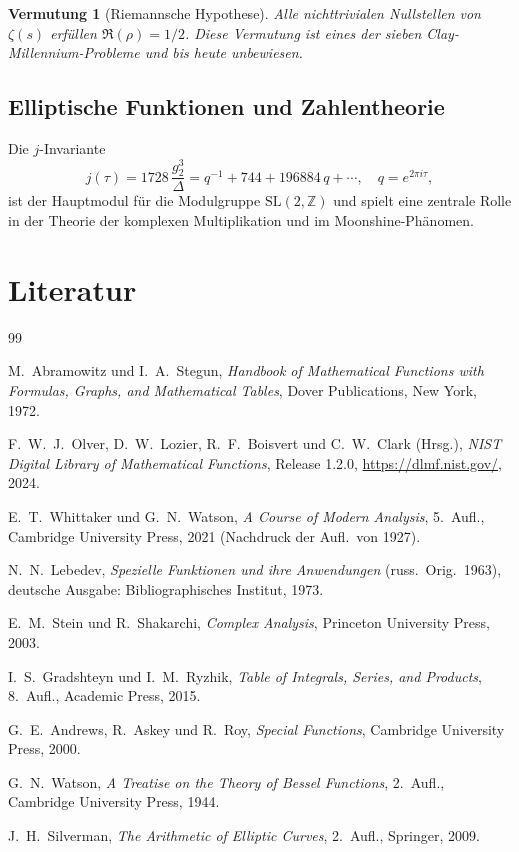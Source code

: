 \documentclass[12pt,a4paper]{amsart}
\newtheorem{conjecture}[theorem]{Vermutung}
\theoremstyle{definition}
\begin{document}
\begin{conjecture}[Riemannsche Hypothese]
Alle nichttrivialen Nullstellen von \(\zeta(s)\) erfüllen \(\Re(\rho) = 1/2\).
Diese Vermutung ist eines der sieben Clay-Millennium-Probleme und bis heute unbewiesen.
\end{conjecture}

\subsection{Elliptische Funktionen und Zahlentheorie}

Die \(j\)-Invariante
\[
  j(\tau) = 1728\,\frac{g_2^3}{\Delta} = q^{-1} + 744 + 196884\,q + \cdots,
  \quad q = e^{2\pi i\tau},
\]
ist der Hauptmodul für die Modulgruppe \(\mathrm{SL}(2,\mathbb{Z})\) und spielt eine
zentrale Rolle in der Theorie der komplexen Multiplikation und im Moonshine-Phänomen.

\section{Literatur}

\begin{thebibliography}{99}

M.~Abramowitz und I.~A.~Stegun,
\textit{Handbook of Mathematical Functions with Formulas, Graphs, and Mathematical Tables},
Dover Publications, New York, 1972.

F.~W.~J.~Olver, D.~W.~Lozier, R.~F.~Boisvert und C.~W.~Clark (Hrsg.),
\textit{NIST Digital Library of Mathematical Functions},
Release 1.2.0, \url{https://dlmf.nist.gov/}, 2024.

E.~T.~Whittaker und G.~N.~Watson,
\textit{A Course of Modern Analysis}, 5.~Aufl.,
Cambridge University Press, 2021 (Nachdruck der Aufl.\ von 1927).

N.~N.~Lebedev,
\textit{Spezielle Funktionen und ihre Anwendungen} (russ.\ Orig.\ 1963),
deutsche Ausgabe: Bibliographisches Institut, 1973.

E.~M.~Stein und R.~Shakarchi,
\textit{Complex Analysis},
Princeton University Press, 2003.

I.~S.~Gradshteyn und I.~M.~Ryzhik,
\textit{Table of Integrals, Series, and Products}, 8.~Aufl.,
Academic Press, 2015.

G.~E.~Andrews, R.~Askey und R.~Roy,
\textit{Special Functions},
Cambridge University Press, 2000.

G.~N.~Watson,
\textit{A Treatise on the Theory of Bessel Functions}, 2.~Aufl.,
Cambridge University Press, 1944.

J.~H.~Silverman,
\textit{The Arithmetic of Elliptic Curves}, 2.~Aufl.,
Springer, 2009.

\end{thebibliography}
\end{document}
